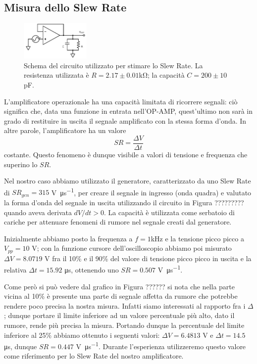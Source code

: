 \subsection{Misura dello Slew Rate}

\begin{figure}
  \begin{center}
    \includegraphics[width=0.30\textwidth]{../E03/latex/slew_rate.pdf}
  \end{center}
  \caption{Schema del circuito utilizzato per stimare lo Slew Rate. La resistenza utilizzata è $R=2.17\pm0.01$\si{\kilo\ohm}; la capacità $C=200 \pm 10$ \si{\pico\farad}.}
  \label{circuito:rel2_correnti_senzaretroazione}
\end{figure}

L'amplificatore operazionale ha una capacità limitata di ricorrere segnali: ciò significa che, data una funzione in entrata nell'OP-AMP, quest'ultimo non sarà in grado di restituire in uscita il segnale amplificato con la stessa forma d'onda. In altre parole, l'amplificatore ha un valore
$$SR = \frac{\Delta V}{\Delta t}$$
costante. Questo fenomeno è dunque visibile a valori di tensione e frequenza che superino lo $SR$.

Nel nostro caso abbiamo utilizzato il generatore, caratterizzato da uno Slew Rate di $SR_{gen}=315$ \si{\volt\per\micro\second}, per creare il segnale in ingresso (onda quadra) e valutato la forma d'onda del segnale in uscita utilizzando il circuito in Figura ????????? quando aveva derivata $dV/dt > 0$. La capacità è utilizzata come serbatoio di cariche per attenuare fenomeni di rumore nel segnale creati dal generatore.

Inizialmente abbiamo posto la frequenza a $f=1$\si{\kilo\hertz} e la tensione picco picco a $V_{pp}=10$ \si{\volt}; con la funzione cursore dell'oscilloscopio abbiamo poi misurato $\Delta V = 8.0719$ \si{\volt} fra il 10\% e il 90\% del valore di tensione picco picco in uscita e la relativa $\Delta t = 15.92$ \si{\micro\second}, ottenendo uno $SR=0.507$ \si{\volt\per\micro\second}.

Come però si può vedere dal grafico in Figura ?????? si nota che nella parte vicina al 10\% è presente una parte di segnale affetta da rumore che potrebbe rendere poco precisa la nostra misura. Infatti siamo interessati al rapporto fra i $\Delta$; dunque portare il limite inferiore ad un valore percentuale più alto, dato il rumore, rende più precisa la misura. Portando dunque la percentuale del limite inferiore al 25\% abbiamo ottenuto i seguenti valori: $\Delta V = 6.4813$ \si{\volt} e $\Delta t = 14.5$ \si{\micro\second}, dunque $SR = 0.447$ \si{\volt\per\micro\second}. Durante l'esperienza utilizzeremo questo valore come riferimento per lo Slew Rate del nostro amplificatore.

